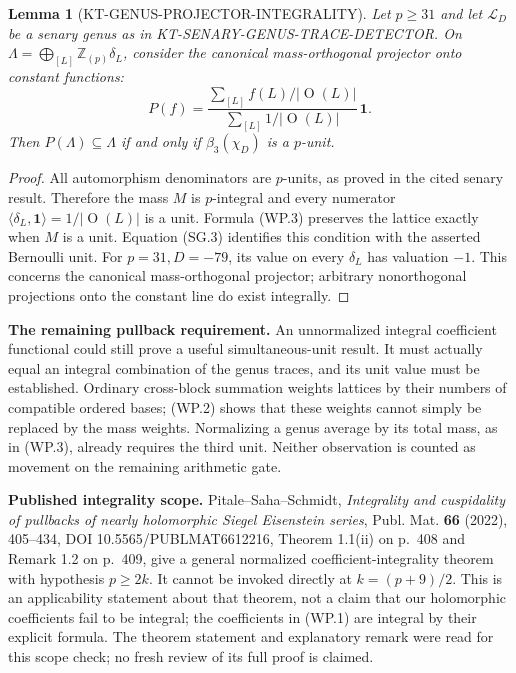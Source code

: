 \documentclass[11pt,a4paper]{article}
\newtheorem{lemma}[theorem]{Lemma}
\theoremstyle{definition}
\renewcommand{\paragraph}[1]{\par\smallskip\noindent\textbf{#1}\quad\ignorespaces}
\begin{document}
\begin{lemma}[KT-GENUS-PROJECTOR-INTEGRALITY]
Let $p\geq31$ and let $\mathcal L_D$ be a senary genus as in
KT-SENARY-GENUS-TRACE-DETECTOR.  On
$\Lambda=\bigoplus_{[L]}\mathbb Z_{(p)}\delta_L$, consider the canonical
mass-orthogonal projector onto constant functions:
\[
 P(f)=\frac{\sum_{[L]}f(L)/|\operatorname O(L)|}
 {\sum_{[L]}1/|\operatorname O(L)|}\,\mathbf1.
 \tag{WP.3}
\]
Then $P(\Lambda)\subseteq\Lambda$ if and only if
$\beta_3(\chi_D)$ is a $p$-unit.
\end{lemma}
\begin{proof}
All automorphism denominators are $p$-units, as proved in the cited
senary result.  Therefore the mass $M$ is $p$-integral and every numerator
$\langle\delta_L,\mathbf1\rangle=1/|\operatorname O(L)|$ is a unit.
Formula (WP.3) preserves the lattice exactly when $M$ is a unit.
Equation (SG.3) identifies this condition with the asserted Bernoulli unit.
For $p=31,D=-79$, its value on every $\delta_L$ has valuation $-1$.
This concerns the canonical mass-orthogonal projector; arbitrary
nonorthogonal projections onto the constant line do exist integrally.
\end{proof}

\paragraph{The remaining pullback requirement.}
An unnormalized integral coefficient functional could still prove a useful
simultaneous-unit result.  It must actually equal an integral combination
of the genus traces, and its unit value must be established.  Ordinary
cross-block summation weights lattices by their numbers of compatible
ordered bases; (WP.2) shows that these weights cannot simply be replaced
by the mass weights.  Normalizing a genus average by its total mass, as in
(WP.3), already requires the third unit.  Neither observation is counted
as movement on the remaining arithmetic gate.

\paragraph{Published integrality scope.}
Pitale--Saha--Schmidt, \emph{Integrality and cuspidality of pullbacks of
nearly holomorphic Siegel Eisenstein series}, Publ. Mat. \textbf{66}
(2022), 405--434, DOI 10.5565/PUBLMAT6612216, Theorem 1.1(ii) on p.~408
and Remark 1.2 on p.~409, give a general normalized coefficient-integrality
theorem with hypothesis $p\geq2k$.  It cannot be invoked directly at
$k=(p+9)/2$.  This is an applicability statement about that theorem,
not a claim that our holomorphic coefficients fail to be integral; the
coefficients in (WP.1) are integral by their explicit formula.  The
theorem statement and explanatory remark were read for this scope check;
no fresh review of its full proof is claimed.
\end{document}
